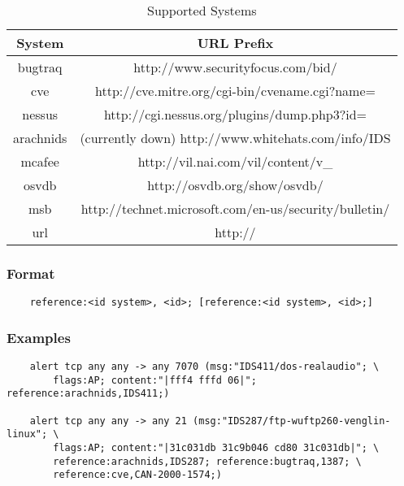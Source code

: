 \documentclass[english]{report}
\begin{document}
\begin{table}[h]
\begin{center}
\caption{Supported Systems}
\label{references systems}
\begin{tabular}{|c|c|}

\hline 
System&
URL Prefix\\
\hline

\hline 
bugtraq&
http://www.securityfocus.com/bid/\\

\hline 
cve&
http://cve.mitre.org/cgi-bin/cvename.cgi?name=\\

\hline 
nessus &
http://cgi.nessus.org/plugins/dump.php3?id=\\

\hline 
arachnids&
(currently down) http://www.whitehats.com/info/IDS\\

\hline 
mcafee&
http://vil.nai.com/vil/content/v\_\\

\hline 
osvdb&
http://osvdb.org/show/osvdb/\\

\hline 
msb&
http://technet.microsoft.com/en-us/security/bulletin/\\

\hline 
url&
http://\\

\hline
\end{tabular}
\end{center}
\end{table}

\subsubsection{Format}

\begin{verbatim}
    reference:<id system>, <id>; [reference:<id system>, <id>;]
\end{verbatim}

\subsubsection{Examples}

\begin{verbatim}
    alert tcp any any -> any 7070 (msg:"IDS411/dos-realaudio"; \
        flags:AP; content:"|fff4 fffd 06|"; reference:arachnids,IDS411;)
    
    alert tcp any any -> any 21 (msg:"IDS287/ftp-wuftp260-venglin-linux"; \
        flags:AP; content:"|31c031db 31c9b046 cd80 31c031db|"; \
        reference:arachnids,IDS287; reference:bugtraq,1387; \
        reference:cve,CAN-2000-1574;)
\end{verbatim}
\end{document}
